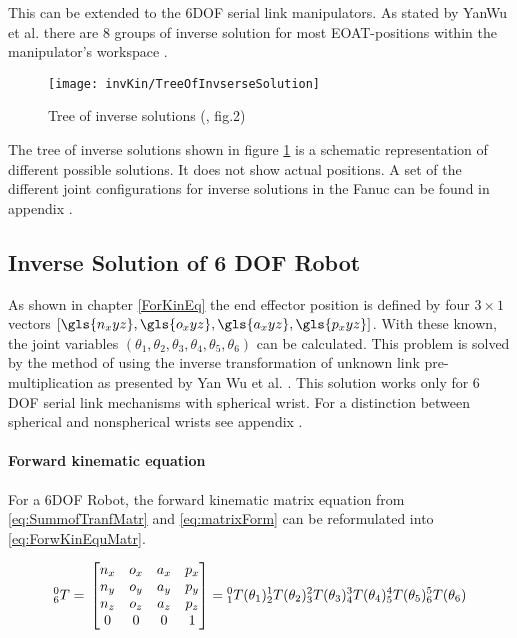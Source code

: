 This can be extended to the 6\ac{DOF} serial link manipulators.
As stated by YanWu et al. there are 8 groups of inverse solution for most \ac{EOAT}-positions within the manipulator's workspace \cite{invKinSolYanWu}. 

\begin{figure}[H]
	\texttt{[image: invKin/TreeOfInvserseSolution]}
	\caption{Tree of inverse solutions (\cite{invKinSolYanWu}, fig.2)}
	\label{fig:invKinTree}
\end{figure}
%
The tree of inverse solutions shown in figure \ref{fig:invKinTree} is a schematic representation of different possible solutions. It does not show actual positions. A set of the different joint configurations for inverse solutions in the Fanuc can be found in appendix .


\subsection{Inverse Solution of 6 \ac{DOF} Robot} \label{sec:InvSol6DOF}

As shown in chapter \ref{ForKinEq} the end effector position is defined by four $3 \times 1$ vectors $[\gls{n_xyz},\gls{o_xyz},\gls{a_xyz},\gls{p_xyz}]$. With these known, the joint variables $(\theta_1, \theta_2, \theta_3, \theta_4, \theta_5, \theta_6)$ can be calculated.
This problem  is solved by the method of using the inverse transformation of unknown link pre-multiplication as presented by Yan Wu et al. \cite{invKinSolYanWu}. This solution works only for 6 \ac{DOF} serial link mechanisms with spherical wrist. For a distinction between spherical and nonspherical wrists see appendix .

\paragraph{Forward kinematic equation}
For a  6\ac{DOF} Robot, the  forward kinematic matrix equation from \ref{eq:SummofTranfMatr} and \ref{eq:matrixForm} can be reformulated into  \ref{eq:ForwKinEquMatr}.

\begin{equation}\label{eq:ForwKinEquMatr}
	^0_6T = \\
	\begin{bmatrix}
n_x & o_x & a_x & p_x \\
n_y & o_y & a_y & p_y \\
n_z & o_z & a_z & p_z \\
0 & 0 & 0 & 1 \\
\end{bmatrix}
=
\phantom{}^0_1T(\theta_1)\phantom{}^1_2T(\theta_2)\phantom{}^2_3T(\theta_3)\phantom{}^3_4T(\theta_4)\phantom{}^4_5T(\theta_5)\phantom{}^5_6T(\theta_6)\\
\end{equation}

